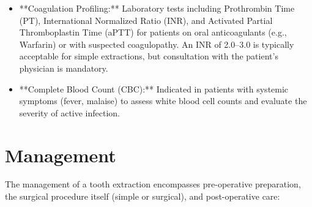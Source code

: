 \begin{itemize}
  \item **Coagulation Profiling:** Laboratory tests including Prothrombin Time (PT), International Normalized Ratio (INR), and Activated Partial Thromboplastin Time (aPTT) for patients on oral anticoagulants (e.g., Warfarin) or with suspected coagulopathy. An INR of 2.0--3.0 is typically acceptable for simple extractions, but consultation with the patient's physician is mandatory.
  \item **Complete Blood Count (CBC):** Indicated in patients with systemic symptoms (fever, malaise) to assess white blood cell counts and evaluate the severity of active infection.
\end{itemize}

\section*{Management}
The management of a tooth extraction encompasses pre-operative preparation, the surgical procedure itself (simple or surgical), and post-operative care:

